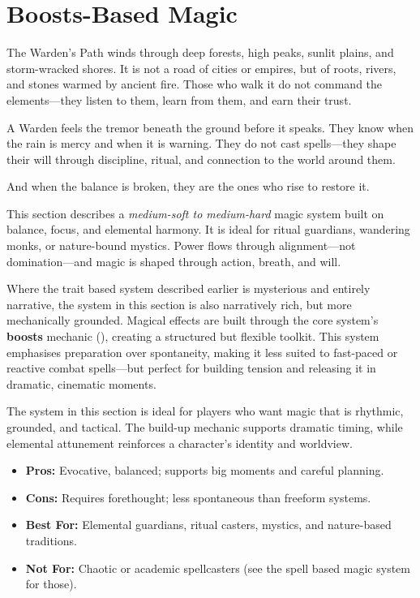\section[Boosts-Based Magic]{Boosts-Based Magic}

\begin{Example}{}
    The Warden’s Path winds through deep forests, high peaks, sunlit plains, and storm-wracked shores. It is not a road of cities or empires, but of roots, rivers, and stones warmed by ancient fire. Those who walk it do not command the elements—they listen to them, learn from them, and earn their trust.

    A Warden feels the tremor beneath the ground before it speaks. They know when the rain is mercy and when it is warning. They do not cast spells—they shape their will through discipline, ritual, and connection to the world around them.

    And when the balance is broken, they are the ones who rise to restore it.
\end{Example}

This section describes a \emph{medium-soft to medium-hard} magic system built on balance, focus, and elemental harmony. It is ideal for ritual guardians, wandering monks, or nature-bound mystics. Power flows through alignment—not domination—and magic is shaped through action, breath, and will.

Where the trait based system described earlier is mysterious and entirely narrative, the system in this section is also narratively rich, but more mechanically grounded. Magical effects are built through the core system’s \textbf{boosts} mechanic (), creating a structured but flexible toolkit. This system emphasises preparation over spontaneity, making it less suited to fast-paced or reactive combat spells—but perfect for building tension and releasing it in dramatic, cinematic moments.

\begin{GmTips}
    The system in this section is ideal for players who want magic that is rhythmic, grounded, and tactical. The build-up mechanic supports dramatic timing, while elemental attunement reinforces a character’s identity and worldview.
    \begin{itemize}
        \item \textbf{Pros:} Evocative, balanced; supports big moments and careful planning.
        \item \textbf{Cons:} Requires forethought; less spontaneous than freeform systems.
        \item \textbf{Best For:} Elemental guardians, ritual casters, mystics, and nature-based traditions.
        \item \textbf{Not For:} Chaotic or academic spellcasters (see the spell based magic system for those).
    \end{itemize}
\end{GmTips}

